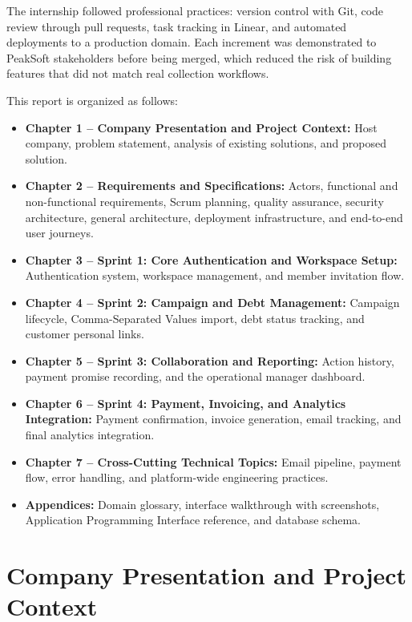 \documentclass[12pt,a4paper]{report}
\begin{document}
The internship followed professional practices: version control with Git, code review through
pull requests, task tracking in Linear, and automated deployments to a production domain.
Each increment was demonstrated to PeakSoft stakeholders before being merged, which reduced
the risk of building features that did not match real collection workflows.

This report is organized as follows:

\begin{itemize}
  \item \textbf{Chapter 1 -- Company Presentation and Project Context:}
        Host company, problem statement, analysis of existing solutions, and proposed solution.
  \item \textbf{Chapter 2 -- Requirements and Specifications:}
        Actors, functional and non-functional requirements, Scrum planning,
        quality assurance, security architecture, general architecture, deployment infrastructure,
        and end-to-end user journeys.
  \item \textbf{Chapter 3 -- Sprint 1: Core Authentication and Workspace Setup:}
        Authentication system, workspace management, and member invitation flow.
  \item \textbf{Chapter 4 -- Sprint 2: Campaign and Debt Management:}
        Campaign lifecycle, Comma-Separated Values import, debt status tracking, and customer personal links.
  \item \textbf{Chapter 5 -- Sprint 3: Collaboration and Reporting:}
        Action history, payment promise recording, and the operational manager dashboard.
  \item \textbf{Chapter 6 -- Sprint 4: Payment, Invoicing, and Analytics Integration:}
        Payment confirmation, invoice generation, email tracking, and final analytics integration.
  \item \textbf{Chapter 7 -- Cross-Cutting Technical Topics:}
        Email pipeline, payment flow, error handling, and platform-wide engineering practices.
  \item \textbf{Appendices:}
        Domain glossary, interface walkthrough with screenshots, Application Programming Interface reference,
        and database schema.
\end{itemize}

\chapter{Company Presentation and Project Context}
\end{document}
